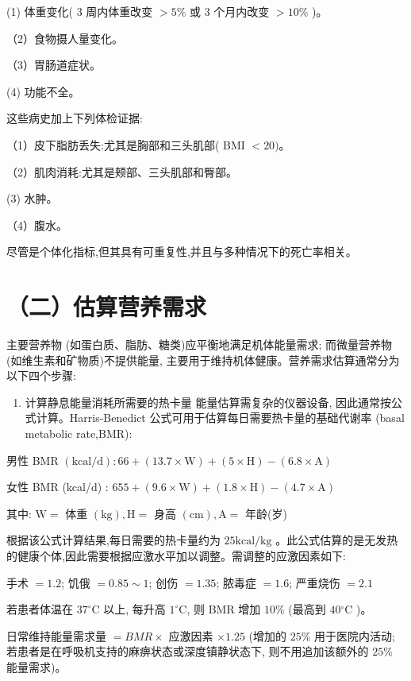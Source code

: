 \documentclass[10pt]{article}
\begin{document}
(1) 体重变化( 3 周内体重改变 $>5 \%$ 或 3 个月内改变 $>10 \%$ )。

（2）食物摄人量变化。

（3）胃肠道症状。

(4) 功能不全。

这些病史加上下列体检证据:

（1）皮下脂肪丢失:尤其是胸部和三头肌部( BMI $<20) 。$

（2）肌肉消耗:尤其是颊部、三头肌部和臀部。

(3) 水肿。

（4）腹水。

尽管是个体化指标,但其具有可重复性,并且与多种情况下的死亡率相关。

\section*{（二）估算营养需求}
主要营养物 (如蛋白质、脂肪、糖类)应平衡地满足机体能量需求; 而微量营养物 (如维生素和矿物质)不提供能量, 主要用于维持机体健康。营养需求估算通常分为以下四个步骤:

\begin{enumerate}
  \item 计算静息能量消耗所需要的热卡量 能量估算需复杂的仪器设备, 因此通常按公式计算。Harris-Benedict 公式可用于估算每日需要热卡量的基础代谢率 (basal metabolic rate,BMR):
\end{enumerate}

男性 BMR $(\mathrm{kcal} / \mathrm{d}): 66+(13.7 \times \mathrm{W})+(5 \times \mathrm{H})-(6.8 \times \mathrm{A})$

女性 BMR (kcal/d) : $655+(9.6 \times \mathrm{W})+(1.8 \times \mathrm{H})-(4.7 \times \mathrm{A})$

其中: $\mathrm{W}=$ 体重 $(\mathrm{kg}), \mathrm{H}=$ 身高 $(\mathrm{cm}), \mathrm{A}=$ 年龄(岁)

根据该公式计算结果,每日需要的热卡量约为 $25 \mathrm{kcal} / \mathrm{kg}$ 。此公式估算的是无发热的健康个体,因此需要根据应激水平加以调整。需调整的应激因素如下:

手术 $=1.2$; 饥俄 $=0.85 \sim 1$; 创伤 $=1.35$; 脓毒症 $=1.6$; 严重烧伤 $=2.1$

若患者体温在 $37^{\circ} \mathrm{C}$ 以上, 每升高 $1^{\circ} \mathrm{C}$, 则 BMR 增加 $10 \%$ (最高到 $40{ }^{\circ} \mathrm{C}$ )。

日常维持能量需求量 $=B M R \times$ 应激因素 $\times 1.25$ (增加的 $25 \%$ 用于医院内活动; 若患者是在呼吸机支持的麻痹状态或深度镇静状态下, 则不用追加该额外的 $25 \%$ 能量需求)。
\end{document}
